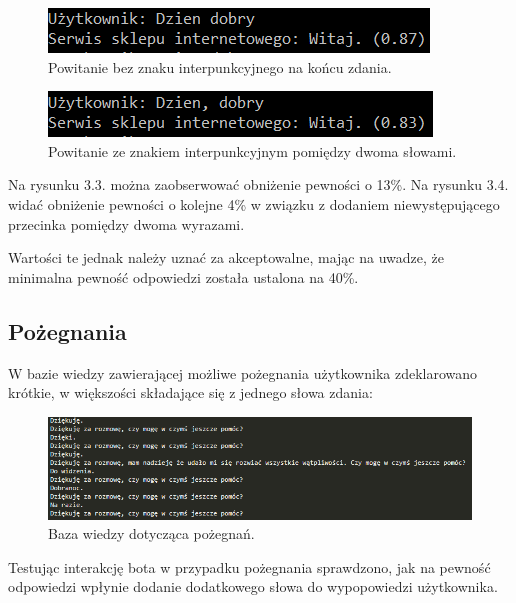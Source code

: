 \begin{figure}[ht]
	{\centering
		\includegraphics[width=0.9\linewidth]{rys/rys03/3}
	\caption{Powitanie bez znaku interpunkcyjnego na końcu zdania.}
	}
	\label{fig:bot4}
\end{figure}

\begin{figure}[ht]
	{\centering
		\includegraphics[width=0.9\linewidth]{rys/rys03/4}
	\caption{Powitanie ze znakiem interpunkcyjnym pomiędzy dwoma słowami.}
	}
	\label{fig:bot4}
\end{figure}

Na rysunku 3.3. można zaobserwować obniżenie pewności o 13\%. 
Na rysunku 3.4. widać obniżenie pewności o kolejne 4\% w związku z dodaniem niewystępującego przecinka pomiędzy dwoma wyrazami. 

Wartości te jednak należy uznać za akceptowalne, mając na uwadze, że minimalna pewność odpowiedzi została ustalona na 40\%.

\subsection{Pożegnania}

W bazie wiedzy zawierającej możliwe pożegnania użytkownika zdeklarowano krótkie, w większości składające się z jednego słowa zdania:

\begin{figure}[ht]
	{\centering
		\includegraphics[width=0.9\linewidth]{rys/rys03/6}
	\caption{Baza wiedzy dotycząca pożegnań.}
	}
	\label{fig:bot4}
\end{figure}

Testując interakcję bota w przypadku pożegnania sprawdzono, jak na pewność odpowiedzi wpłynie dodanie dodatkowego słowa do wypopowiedzi użytkownika.

